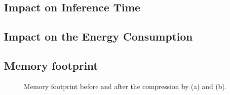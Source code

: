 \subsection{Impact on Inference Time}


\subsection{Impact on the Energy Consumption}


\subsection{Memory footprint}
\begin{figure}[!t]
\centering
{}
\hfill
{}
\hfill

\caption{Memory footprint before and after the compression by \quantization(a) and \pruning (b).}
\label{fig:footprint}
\end{figure}


